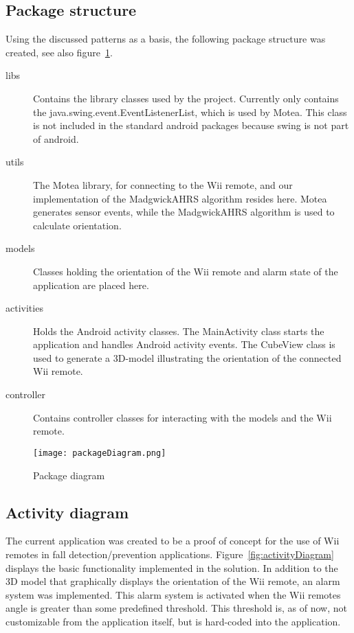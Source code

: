 \subsection{Package structure}
Using the discussed patterns as a basis, the following package structure was created, see also figure~\ref{fig:packageDiagram}.

\begin{description}
	\item[libs] Contains the library classes used by the project. Currently only contains the java.swing.event.EventListenerList, which is used by Motea. This class is not included in the standard android packages because swing is not part of android.
	\item[utils] The Motea library, for connecting to the Wii remote, and our implementation of the MadgwickAHRS algorithm resides here. Motea generates sensor events, while the MadgwickAHRS algorithm is used to calculate orientation.
	\item[models] Classes holding the orientation of the Wii remote and alarm state of the application are placed here.
	\item[activities] Holds the Android activity classes. The MainActivity class starts the application and handles Android activity events. The CubeView class is used to generate a 3D-model illustrating the orientation of the connected Wii remote.
	\item[controller] Contains controller classes for interacting with the models and the Wii remote.
\end{description}

\begin{figure}[h!]
  \centering
    \texttt{[image: packageDiagram.png]}
    \caption{\footnotesize Package diagram}
    \label{fig:packageDiagram}
\end{figure}

\subsection{Activity diagram}
The current application was created to be a proof of concept for the use of Wii remotes in fall detection/prevention applications. Figure~\ref{fig:activityDiagram} displays the basic functionality implemented in the solution. In addition to the 3D model that graphically displays the orientation of the Wii remote, an alarm system was implemented. This alarm system is activated when the Wii remotes angle is greater than some predefined threshold. This threshold  is, as of now, not customizable from the application itself, but is hard-coded  into the application.

